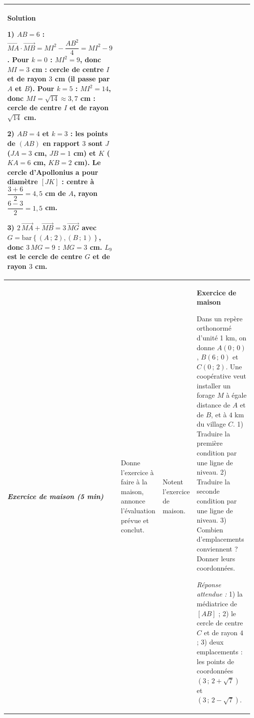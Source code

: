 \documentclass[10pt,a4paper,landscape]{article}
\newcommand{\vc}[1]{\overrightarrow{#1}}                                 %
\newcommand{\barG}[1]{\mathrm{bar}\left\{#1\right\}}                      %
\newcommand{\bleu}[1]{{\color{cBleu}\bfseries #1}}                        %
\newcommand{\moment}[1]{\textbf{\itshape #1}}                             %
\begin{document}
{\begin{longtable}{|J{2.12cm}|L{5.17cm}|L{4.37cm}|L{13.64cm}|}
\bleu{Solution}

\textbf{1) $AB=6$ :} $\vc{MA}\cdot\vc{MB}=MI^2-\dfrac{AB^2}{4}=MI^2-9$.
Pour $k=0$ : $MI^2=9$, donc $MI=3$ cm : cercle de centre $I$ et de rayon $3$ cm (il passe par $A$ et $B$).
Pour $k=5$ : $MI^2=14$, donc $MI=\sqrt{14}\approx 3{,}7$ cm : cercle de centre $I$ et de rayon $\sqrt{14}$ cm.

\textbf{2) $AB=4$ et $k=3$ :} les points de $(AB)$ en rapport $3$ sont $J$ ($JA=3$ cm, $JB=1$ cm) et $K$ ($KA=6$ cm, $KB=2$ cm).
Le cercle d'Apollonius a pour diamètre $[JK]$ : centre à $\dfrac{3+6}{2}=4{,}5$ cm de $A$, rayon $\dfrac{6-3}{2}=1{,}5$ cm.

\textbf{3)} $2\,\vc{MA}+\vc{MB}=3\,\vc{MG}$ avec $G=\barG{(A\,;\,2),(B\,;\,1)}$, donc $3\,MG=9$ : $MG=3$ cm.
$L_9$ est le cercle de centre $G$ et de rayon $3$ cm.
\\
\hline
\moment{Exercice de maison (5 min)} &
Donne l'exercice à faire à la maison, annonce l'évaluation prévue et conclut. &
Notent l'exercice de maison. &
\bleu{Exercice de maison}

Dans un repère orthonormé d'unité 1 km, on donne $A(0\,;\,0)$, $B(6\,;\,0)$ et $C(0\,;\,2)$. Une coopérative
veut installer un forage $M$ à égale distance de $A$ et de $B$, et à $4$ km du village $C$.
1) Traduire la première condition par une ligne de niveau.
2) Traduire la seconde condition par une ligne de niveau.
3) Combien d'emplacements conviennent ? Donner leurs coordonnées.

\emph{Réponse attendue :} 1) la médiatrice de $[AB]$ ; 2) le cercle de centre $C$ et de rayon $4$ ; 3) deux
emplacements : les points de coordonnées $(3\,;\,2+\sqrt{7})$ et $(3\,;\,2-\sqrt{7})$.
\\
\hline
\end{longtable}}
\end{document}
